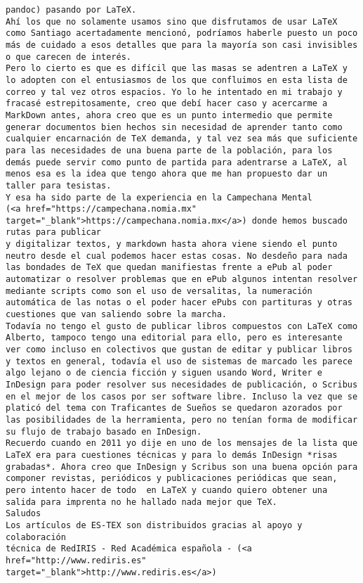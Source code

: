 \documentclass[a4paper,10pt]{article}
\begin{document}
\begin{lstlisting}
pandoc) pasando por LaTeX.
Ahí los que no solamente usamos sino que disfrutamos de usar LaTeX
como Santiago acertadamente mencionó, podríamos haberle puesto un poco
más de cuidado a esos detalles que para la mayoría son casi invisibles
o que carecen de interés.
Pero lo cierto es que es difícil que las masas se adentren a LaTeX y
lo adopten con el entusiasmos de los que confluimos en esta lista de
correo y tal vez otros espacios. Yo lo he intentado en mi trabajo y
fracasé estrepitosamente, creo que debí hacer caso y acercarme a
MarkDown antes, ahora creo que es un punto intermedio que permite
generar documentos bien hechos sin necesidad de aprender tanto como
cualquier encarnación de TeX demanda, y tal vez sea más que suficiente
para las necesidades de una buena parte de la población, para los
demás puede servir como punto de partida para adentrarse a LaTeX, al
menos esa es la idea que tengo ahora que me han propuesto dar un
taller para tesistas.
Y esa ha sido parte de la experiencia en la Campechana Mental
(<a href="https://campechana.nomia.mx" target="_blank">https://campechana.nomia.mx</a>) donde hemos buscado rutas para publicar
y digitalizar textos, y markdown hasta ahora viene siendo el punto
neutro desde el cual podemos hacer estas cosas. No desdeño para nada
las bondades de TeX que quedan manifiestas frente a ePub al poder
automatizar o resolver problemas que en ePub algunos intentan resolver
mediante scripts como son el uso de versalitas, la numeración
automática de las notas o el poder hacer ePubs con partituras y otras
cuestiones que van saliendo sobre la marcha.
Todavía no tengo el gusto de publicar libros compuestos con LaTeX como
Alberto, tampoco tengo una editorial para ello, pero es interesante
ver como incluso en colectivos que gustan de editar y publicar libros
y textos en general, todavía el uso de sistemas de marcado les parece
algo lejano o de ciencia ficción y siguen usando Word, Writer e
InDesign para poder resolver sus necesidades de publicación, o Scribus
en el mejor de los casos por ser software libre. Incluso la vez que se
platicó del tema con Traficantes de Sueños se quedaron azorados por
las posibilidades de la herramienta, pero no tenían forma de modificar
su flujo de trabajo basado en InDesign.
Recuerdo cuando en 2011 yo dije en uno de los mensajes de la lista que
LaTeX era para cuestiones técnicas y para lo demás InDesign *risas
grabadas*. Ahora creo que InDesign y Scribus son una buena opción para
componer revistas, periódicos y publicaciones periódicas que sean,
pero intento hacer de todo  en LaTeX y cuando quiero obtener una
salida para imprenta no he hallado nada mejor que TeX.
Saludos
Los artículos de ES-TEX son distribuidos gracias al apoyo y colaboración 
técnica de RedIRIS - Red Académica española - (<a href="http://www.rediris.es" target="_blank">http://www.rediris.es</a>)

\end{lstlisting}
\end{document}
